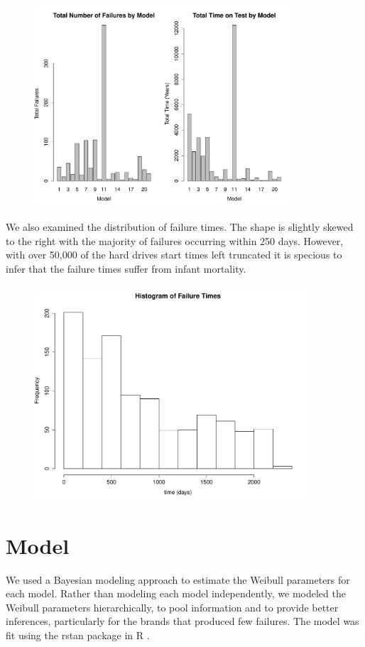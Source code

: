 \documentclass{scrartcl}
\begin{document}
\begin{figure}[H]
\centering
\includegraphics[height=7.5cm]{sumstat1.pdf}
\end{figure}
\noindent We also examined the distribution of failure times.  The shape is slightly skewed to the right with the majority of failures occurring within 250 days. However, with over 50,000 of the hard drives start times left truncated it is specious to infer that the failure times suffer from infant mortality.   
\begin{figure}[H]
\centering
\includegraphics[height=8cm]{failhist.pdf}
\end{figure}

\section*{Model}
\noindent We used a Bayesian modeling approach to estimate the Weibull parameters for each model. Rather than modeling each model independently, we modeled the Weibull parameters hierarchically, to pool information and to provide better inferences, particularly for the brands that produced few failures. The model was fit using the rstan package in R \cite{stan}.\\
\end{document}
